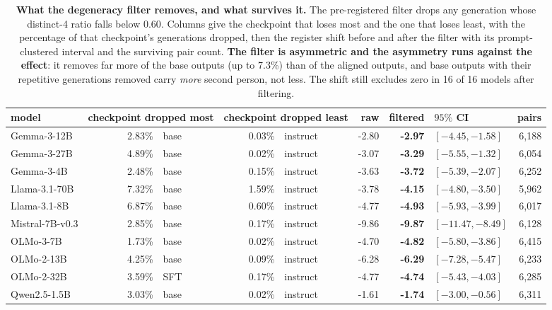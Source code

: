 \begin{table}[tb]\centering\small
\caption{\textbf{What the degeneracy filter removes, and what survives it.} The pre-registered filter drops any generation whose distinct-4 ratio falls below $0.60$. Columns give the checkpoint that loses most and the one that loses least, with the percentage of that checkpoint's generations dropped, then the register shift before and after the filter with its prompt-clustered interval and the surviving pair count. \textbf{The filter is asymmetric and the asymmetry runs against the effect}: it removes far more of the base outputs (up to 7.3\%) than of the aligned outputs, and base outputs with their repetitive generations removed carry \emph{more} second person, not less. The shift still excludes zero in 16 of 16 models after filtering.}
\label{tab:degen}
\begin{tabular}{lrlrl@{\hspace{8pt}}rrlr}
\toprule
model & \multicolumn{2}{c}{checkpoint dropped most} & \multicolumn{2}{c}{checkpoint dropped least} & raw & filtered & $95\%$ CI & pairs \\
\midrule
Gemma-3-12B & 2.83\% & base & 0.03\% & instruct & -2.80 & \textbf{-2.97} & $[-4.45{,}-1.58]$ & 6{,}188 \\
Gemma-3-27B & 4.89\% & base & 0.02\% & instruct & -3.07 & \textbf{-3.29} & $[-5.55{,}-1.32]$ & 6{,}054 \\
Gemma-3-4B & 2.48\% & base & 0.15\% & instruct & -3.63 & \textbf{-3.72} & $[-5.39{,}-2.07]$ & 6{,}252 \\
Llama-3.1-70B & 7.32\% & base & 1.59\% & instruct & -3.78 & \textbf{-4.15} & $[-4.80{,}-3.50]$ & 5{,}962 \\
Llama-3.1-8B & 6.87\% & base & 0.60\% & instruct & -4.77 & \textbf{-4.93} & $[-5.93{,}-3.99]$ & 6{,}017 \\
Mistral-7B-v0.3 & 2.85\% & base & 0.17\% & instruct & -9.86 & \textbf{-9.87} & $[-11.47{,}-8.49]$ & 6{,}128 \\
OLMo-3-7B & 1.73\% & base & 0.02\% & instruct & -4.70 & \textbf{-4.82} & $[-5.80{,}-3.86]$ & 6{,}415 \\
OLMo-2-13B & 4.25\% & base & 0.09\% & instruct & -6.28 & \textbf{-6.29} & $[-7.28{,}-5.47]$ & 6{,}233 \\
OLMo-2-32B & 3.59\% & SFT & 0.17\% & instruct & -4.77 & \textbf{-4.74} & $[-5.43{,}-4.03]$ & 6{,}285 \\
Qwen2.5-1.5B & 3.03\% & base & 0.02\% & instruct & -1.61 & \textbf{-1.74} & $[-3.00{,}-0.56]$ & 6{,}311 \\

\end{tabular}
\end{table}
